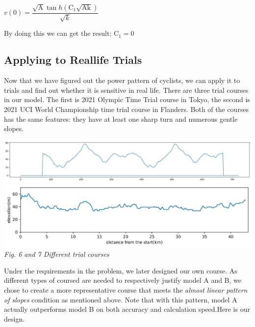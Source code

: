 \documentclass[12pt]{article}
\theoremstyle{definition}
\theoremstyle{remark}
\numberwithin{equation}{section}
\begin{document}
	$v(0)=\dfrac{\sqrt{\mathrm{A}} \tan h \left(\mathrm{C}_1\sqrt{\mathrm{Ak}}\right)}{\sqrt{ k }}$

	By doing this we can get the result: $\mathrm{C}_1=0$
	\subsection{Applying to Reallife Trials}
	Now that we have figured out the power pattern of cyclists, we can apply it to trials and find out whether it is sensitive in real life. There are three trial courses in our model. The first is 2021 Olympic Time Trial course in Tokyo, the second is 2021 UCI World Championship time trial course in Flanders. Both of the courses has the same features: they have at least one sharp turn and numerous gentle slopes.

	\begin{center}
		\includegraphics[width=15cm]{6.png}\\
		\includegraphics[width=15cm]{7.png}\\
		\small \textit{Fig. 6 and 7  Different trial courses}
	\end{center}	
	Under the requirements in the problem, we later designed our own course. As different types of coursed are needed to respectively justify model A and B, we chose to create a more representative course that meets the \textit{almost linear pattern of slopes} condition as mentioned above. Note that with this pattern, model A actually outperforms model B on both accuracy and calculation speed.Here is our design.
\end{document}
